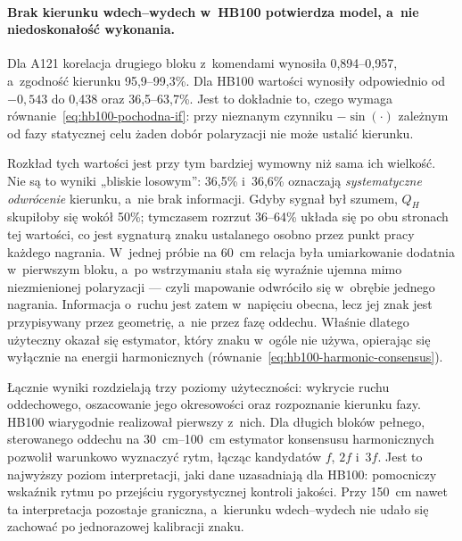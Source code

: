\documentclass[12pt,a4paper,oneside]{report}
\begin{document}
\paragraph{Brak kierunku wdech--wydech w~HB100 potwierdza model, a~nie
niedoskonałość wykonania.} Dla A121 korelacja drugiego bloku z~komendami
wynosiła 0,894--0,957, a~zgodność kierunku 95,9--99,3\%. Dla HB100 wartości
wynosiły odpowiednio od $-0{,}543$ do 0,438 oraz 36,5--63,7\%. Jest to
dokładnie to, czego wymaga równanie~\eqref{eq:hb100-pochodna-if}: przy
nieznanym czynniku $-\sin(\cdot)$ zależnym od fazy statycznej celu żaden dobór
polaryzacji nie może ustalić kierunku.

Rozkład tych wartości jest przy tym bardziej wymowny niż sama ich wielkość.
Nie są to wyniki „bliskie losowym'': 36,5\% i~36,6\% oznaczają
\emph{systematyczne odwrócenie} kierunku, a~nie brak informacji. Gdyby sygnał
był szumem, $Q_H$ skupiłoby się wokół 50\%; tymczasem rozrzut 36--64\% układa
się po obu stronach tej wartości, co jest sygnaturą znaku ustalanego osobno
przez punkt pracy każdego nagrania. W~jednej próbie na \SI{60}{cm} relacja
była umiarkowanie dodatnia w~pierwszym bloku, a~po wstrzymaniu stała się
wyraźnie ujemna mimo niezmienionej polaryzacji --- czyli mapowanie odwróciło
się w~obrębie jednego nagrania. Informacja o~ruchu jest zatem w~napięciu
obecna, lecz jej znak jest przypisywany przez geometrię, a~nie przez fazę
oddechu. Właśnie dlatego użyteczny okazał się estymator, który znaku w~ogóle
nie używa, opierając się wyłącznie na energii harmonicznych
(równanie~\eqref{eq:hb100-harmonic-consensus}).

Łącznie wyniki rozdzielają trzy poziomy użyteczności: wykrycie ruchu
oddechowego, oszacowanie jego okresowości oraz rozpoznanie kierunku fazy.
HB100 wiarygodnie realizował pierwszy z~nich. Dla długich bloków pełnego,
sterowanego oddechu na \SIrange{30}{100}{cm} estymator konsensusu
harmonicznych pozwolił warunkowo wyznaczyć rytm, łącząc kandydatów $f$, $2f$
i~$3f$. Jest to najwyższy poziom interpretacji, jaki dane uzasadniają dla
HB100: pomocniczy wskaźnik rytmu po przejściu rygorystycznej kontroli jakości.
Przy \SI{150}{cm} nawet ta interpretacja pozostaje graniczna, a~kierunku
wdech--wydech nie udało się zachować po jednorazowej kalibracji znaku.
\end{document}
